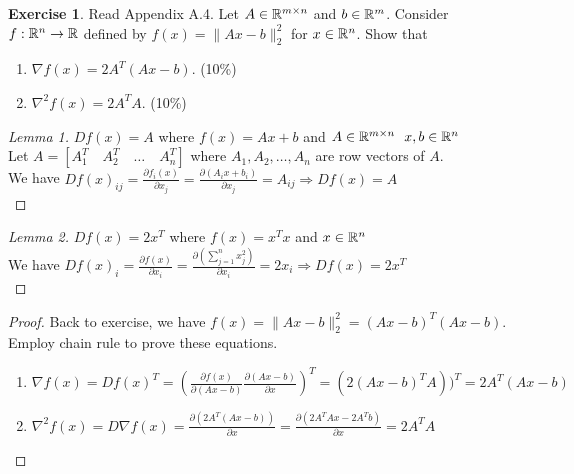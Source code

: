 \documentclass[12pt]{extarticle}
\theoremstyle{definition}
\newtheorem{exercise}{Exercise}
\begin{document}
\begin{exercise}
  Read Appendix A.4. Let $A\in \mathbb{R}^{m\times n}$ and $b\in \mathbb{R}^m$. Consider $f:\mathbb{R}^n\to\mathbb{R}$ defined by $f(x)=\|Ax-b\|_2^2$ for $x\in \mathbb{R}^n$. Show that
  \begin{enumerate}[label=(\alph*)]
    \item $\nabla f(x) = 2A^T(Ax-b)$. (10\%)
    \item $\nabla^2f(x) = 2A^TA$. (10\%)
  \end{enumerate}
\end{exercise}
\begin{proof}[Lemma 1]
  \let\qed\relax
  $Df(x)=A$ where $f(x)=Ax+b$ and $A\in\R^{m\times n}\ \ x,b\in\R^n$\\
  Let $A=[A_1^T\quad A_2^T\quad\dots\quad A_n^T]$ where $A_1,A_2,\dots,A_n$ are row vectors of $A$.\\
  We have $Df(x)_{ij}=\frac{\partial f_i(x)}{\partial x_j}=\frac{\partial (A_ix+b_i)}{\partial x_j}=A_{ij}\Rightarrow Df(x)=A$\\
\end{proof}
\begin{proof}[Lemma 2]
  \let\qed\relax
  $Df(x)=2x^T$ where $f(x)=x^Tx$ and $x\in\mathbb{R}^n$\\
  We have $Df(x)_{i}=\frac{\partial f(x)}{\partial x_i}=\frac{\partial (\sum_{j=1}^n x_j^2)}{\partial x_i}=2x_i\Rightarrow Df(x)=2x^T$\\
\end{proof}
\begin{proof}
  Back to exercise, we have $f(x)=\|Ax-b\|_2^2=(Ax-b)^T(Ax-b)$.\\
  Employ chain rule to prove these equations.
  \begin{enumerate}[label=(\alph*)]
    \item $\nabla f(x)=Df(x)^T=\left(\frac{\partial f(x)}{\partial (Ax-b)}\frac{\partial (Ax-b)}{\partial x}\right)^T=(2(Ax-b)^TA))^T=2A^T(Ax-b)$\\
    \item $\nabla^2 f(x)=D\nabla f(x)=\frac{\partial (2A^T(Ax-b))}{\partial x}=\frac{\partial (2A^TAx-2A^Tb)}{\partial x}=2A^TA$ \qedhere
  \end{enumerate}
\end{proof}
\end{document}
